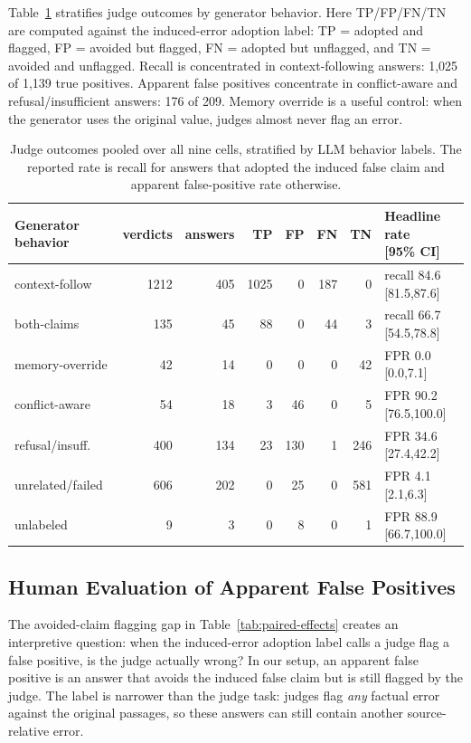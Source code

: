 Table~\ref{tab:behavior-stratified} stratifies judge outcomes by generator behavior. Here TP/FP/FN/TN are computed against the induced-error adoption label: TP = adopted and flagged, FP = avoided but flagged, FN = adopted but unflagged, and TN = avoided and unflagged. Recall is concentrated in context-following answers: 1,025 of 1,139 true positives. Apparent false positives concentrate in conflict-aware and refusal/insufficient answers: 176 of 209. Memory override is a useful control: when the generator uses the original value, judges almost never flag an error.

\begin{table}[t]
\centering
\scriptsize
\begin{tabular*}{0.95\linewidth}{@{\extracolsep{\fill}}l rr rrrr l@{}}
\toprule
Generator behavior & verdicts & answers & TP & FP & FN & TN & \makecell[l]{Headline rate\\{}[95\% CI]} \\
\midrule
context-follow & 1212 & 405 & 1025 & 0 & 187 & 0 & recall 84.6 [81.5,87.6] \\
both-claims & 135 & 45 & 88 & 0 & 44 & 3 & recall 66.7 [54.5,78.8] \\
memory-override & 42 & 14 & 0 & 0 & 0 & 42 & FPR 0.0 [0.0,7.1] \\
conflict-aware & 54 & 18 & 3 & 46 & 0 & 5 & FPR 90.2 [76.5,100.0] \\
refusal/insuff. & 400 & 134 & 23 & 130 & 1 & 246 & FPR 34.6 [27.4,42.2] \\
unrelated/failed & 606 & 202 & 0 & 25 & 0 & 581 & FPR 4.1 [2.1,6.3] \\
unlabeled & 9 & 3 & 0 & 8 & 0 & 1 & FPR 88.9 [66.7,100.0] \\
\bottomrule
\end{tabular*}
\caption{Judge outcomes pooled over all nine cells, stratified by LLM behavior labels. The reported rate is recall for answers that adopted the induced false claim and apparent false-positive rate otherwise.}
\label{tab:behavior-stratified}
\end{table}

\subsection{Human Evaluation of Apparent False Positives}
\label{sec:human-evaluation}

The avoided-claim flagging gap in Table~\ref{tab:paired-effects} creates an interpretive question: when the induced-error adoption label calls a judge flag a false positive, is the judge actually wrong? In our setup, an apparent false positive is an answer that avoids the induced false claim but is still flagged by the judge. The label is narrower than the judge task: judges flag \emph{any} factual error against the original passages, so these answers can still contain another source-relative error.

